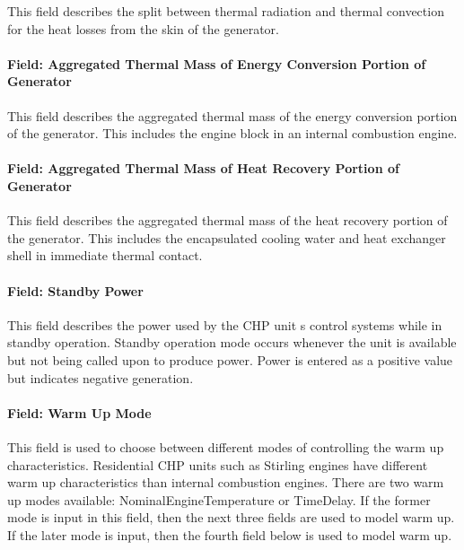 This field describes the split between thermal radiation and thermal convection for the heat losses from the skin of the generator.

\paragraph{Field: Aggregated Thermal Mass of Energy Conversion Portion of Generator}\label{field-aggregated-thermal-mass-of-energy-conversion-portion-of-generator}

This field describes the aggregated thermal mass of the energy conversion portion of the generator. This includes the engine block in an internal combustion engine.

\paragraph{Field: Aggregated Thermal Mass of Heat Recovery Portion of Generator}\label{field-aggregated-thermal-mass-of-heat-recovery-portion-of-generator}

This field describes the aggregated thermal mass of the heat recovery portion of the generator. This includes the encapsulated cooling water and heat exchanger shell in immediate thermal contact.

\paragraph{Field: Standby Power}\label{field-standby-power-1}

This field describes the power used by the CHP unit s control systems while in standby operation. Standby operation mode occurs whenever the unit is available but not being called upon to produce power. Power is entered as a positive value but indicates negative generation.

\paragraph{Field: Warm Up Mode}\label{field-warm-up-mode}

This field is used to choose between different modes of controlling the warm up characteristics. Residential CHP units such as Stirling engines have different warm up characteristics than internal combustion engines. There are two warm up modes available: NominalEngineTemperature or TimeDelay. If the former mode is input in this field, then the next three fields are used to model warm up. If the later mode is input, then the fourth field below is used to model warm up.

